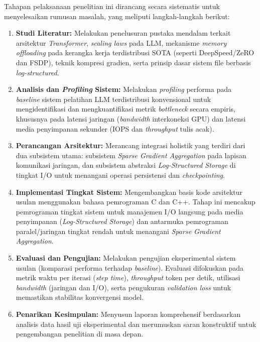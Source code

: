 Tahapan pelaksanaan penelitian ini dirancang secara sistematis untuk menyelesaikan rumusan masalah, yang meliputi langkah-langkah berikut:
\begin{enumerate}
    \item \textbf{Studi Literatur:} Melakukan penelusuran pustaka mendalam terkait arsitektur \textit{Transformer}, \textit{scaling laws} pada LLM, mekanisme \textit{memory offloading} pada kerangka kerja terdistribusi SOTA (seperti DeepSpeed/ZeRO dan FSDP), teknik kompresi gradien, serta prinsip dasar sistem file berbasis \textit{log-structured}.
    \item \textbf{Analisis dan \textit{Profiling} Sistem:} Melakukan \textit{profiling} performa pada \textit{baseline} sistem pelatihan LLM terdistribusi konvensional untuk mengidentifikasi dan mengkuantifikasi metrik \textit{bottleneck} secara empiris, khususnya pada latensi jaringan (\textit{bandwidth} interkoneksi GPU) dan latensi media penyimpanan sekunder (IOPS dan \textit{throughput} tulis acak).
    \item \textbf{Perancangan Arsitektur:} Merancang integrasi holistik yang terdiri dari dua subsistem utama: subsistem \textit{Sparse Gradient Aggregation} pada lapisan komunikasi jaringan, dan subsistem abstraksi \textit{Log-Structured Storage} di tingkat I/O untuk menangani operasi persistensi dan \textit{checkpointing}.
    \item \textbf{Implementasi Tingkat Sistem:} Mengembangkan basis kode arsitektur usulan menggunakan bahasa pemrograman C dan C++. Tahap ini mencakup pemrograman tingkat sistem untuk manajemen I/O langsung pada media penyimpanan (\textit{Log-Structured Storage}) dan antarmuka pemrograman paralel/jaringan tingkat rendah untuk menangani \textit{Sparse Gradient Aggregation}.
    \item \textbf{Evaluasi dan Pengujian:} Melakukan pengujian eksperimental sistem usulan (komparasi performa terhadap \textit{baseline}). Evaluasi difokuskan pada metrik waktu per iterasi (\textit{step time}), \textit{throughput} token per detik, utilisasi \textit{bandwidth} (jaringan dan I/O), serta pengukuran \textit{validation loss} untuk memastikan stabilitas konvergensi model.
    \item \textbf{Penarikan Kesimpulan:} Menyusun laporan komprehensif berdasarkan analisis data hasil uji eksperimental dan merumuskan saran konstruktif untuk pengembangan penelitian di masa depan.
\end{enumerate}

